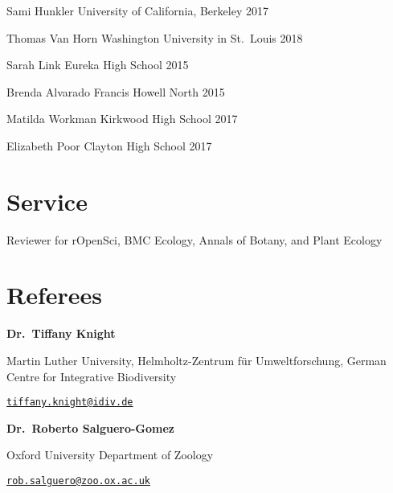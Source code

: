 \documentclass[11pt,]{article}
\begin{document}
Sami Hunkler \hfill University of California, Berkeley 2017

Thomas Van Horn \hfill Washington University in St.~Louis 2018

Sarah Link \hfill Eureka High School 2015

Brenda Alvarado \hfill Francis Howell North 2015

Matilda Workman \hfill Kirkwood High School 2017

Elizabeth Poor \hfill Clayton High School 2017

\hypertarget{service}{%
\section{Service}\label{service}}

Reviewer for rOpenSci, BMC Ecology, Annals of Botany, and Plant Ecology

\hypertarget{referees}{%
\section{Referees}\label{referees}}

\textbf{Dr.~Tiffany Knight}

Martin Luther University, Helmholtz-Zentrum für Umweltforschung, German
Centre for Integrative Biodiversity

\href{mailto:tiffany.knight@idiv.de}{\nolinkurl{tiffany.knight@idiv.de}}

\textbf{Dr.~Roberto Salguero-Gomez}

Oxford University Department of Zoology

\href{mailto:rob.salguero@zoo.ox.ac.uk}{\nolinkurl{rob.salguero@zoo.ox.ac.uk}}
\end{document}
